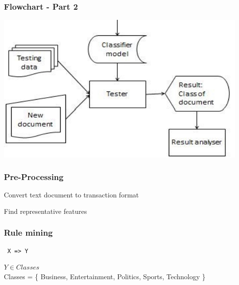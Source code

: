\documentclass{beamer}
\begin{document}
		\begin{frame}
			\frametitle{Flowchart - Part 2}
			\begin {center}
			\includegraphics[scale=0.6]{flowchart2.png}
			\end {center}
		\end{frame}

		\begin{frame}
			\frametitle{Pre-Processing}
			\LARGE{Convert text document to transaction format} \\
			\textcolor{ExecusharesGrey}{\footnotesize\hspace{1em}{ Tokenizing. Stop word removal. POS Tagging. Stemming. Tf-Idf.   } }
			
			\LARGE{Find representative features} \\
			\textcolor{ExecusharesGrey}{\footnotesize\hspace{1em}{Features found only in a particular class } }
		    		
		\end{frame}
		
		\begin{frame}
			\frametitle{Rule mining}
			\begin{center}
			\LARGE{\texttt{ X => Y}} \\
			\end{center}
			
			$ Y \in Classes $ \\ 
			Classes = \{ Business, Entertainment, Politics, Sports, Technology \} 
		    		
		\end{frame}
		
\end{document}
